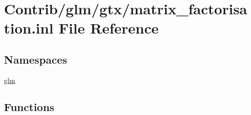 \hypertarget{matrix__factorisation_8inl}{}\section{Contrib/glm/gtx/matrix\+\_\+factorisation.inl File Reference}
\label{matrix__factorisation_8inl}
\subsection*{Namespaces}
\begin{DoxyCompactItemize}
\item 
 \mbox{\hyperlink{namespaceglm}{glm}}
\end{DoxyCompactItemize}
\subsection*{Functions}
